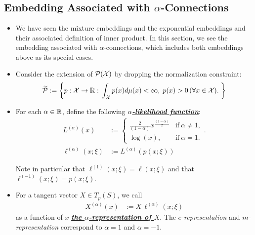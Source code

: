 \documentclass[11pt]{article}
\begin{document}
\subsection{Embedding Associated with $\alpha$-Connections}
\begin{itemize}
\item We have seen the mixture embeddings and the exponential embeddings and their associated definition of inner product. In this section, we see the embedding associated with $\alpha$-connections, which includes both embeddings above as its special cases. 

\item Consider the extension of ${\mathcal P}({\mathcal X})$ by dropping the normalization constraint:
\begin{align*}
\widetilde{{\mathcal P}} := \left\{p: {\mathcal X} \rightarrow {\mathbb R}: \, \int_{{\mathcal X}} p(x)d\mu(x) < \infty,\;  p(x) > 0 \,(\forall x \in {\mathcal X}). \;  \right\}
\end{align*}

\item \begin{definition}
For each $\alpha \in {\mathbb R}$, define the following \underline{\emph{\textbf{$\alpha$-likelihood function}}}: 
\begin{align}
L^{(\alpha)}(x) &:= \left\{ 
\begin{array}{cc}
\frac{2}{(1-\alpha)} x^{\frac{(1-\alpha)}{2}}& \text{if}\ \alpha\neq 1, \\
  \log(x), & \text{if}\ \alpha=1.
\end{array}
\right..  \label{eqn: alpha_embeddings}\\
\ell^{(\alpha)}(x; \xi) &:= L^{(\alpha)}(p(x; \xi)) \label{eqn: alpha_likelihood}
\end{align}
\end{definition}

Note in particular that $\ell^{(1)}(x; \xi) = \ell(x; \xi)$ and that $\ell^{(-1)}(x; \xi) = p(x; \xi)$.

\item \begin{definition}
For a tangent vector $X \in T_{p}(S)$, we call 
\begin{align}
X^{(\alpha)}(x) &:= X\,\ell^{(\alpha)}(x; \xi) \label{eqn: alpha_representatin}
\end{align} as a function of $x$ \underline{\emph{\textbf{the $\alpha$-representation of $X$}}}. The \emph{$e$-representation} and \emph{$m$-representation} correspond to $\alpha = 1$ and $\alpha = -1$.
\end{definition}


\end{itemize}
\end{document}
